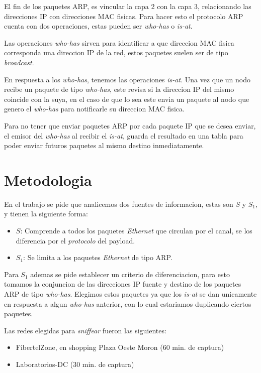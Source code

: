 El fin de los paquetes ARP, es vincular la capa 2 con la capa 3, relacionando las direcciones IP con direcciones MAC fisicas. Para hacer esto el protocolo ARP cuenta con dos operaciones, estas pueden ser \textit{who-has} o \textit{is-at}.

Las operaciones \textit{who-has} sirven para identificar a que direccion MAC fisica corresponda una direccion IP de la red, estos paquetes suelen ser de tipo \textit{broadcast}.

En respuesta a los \textit{who-has}, tenemos las operaciones \textit{is-at}. Una vez que un nodo recibe un paquete de tipo \textit{who-has}, este revisa si la direccion IP del mismo coincide con la suya, en el caso de que lo sea este envia un paquete al nodo que genero el \textit{who-has} para notificarle su direccion MAC fisica.

Para no tener que enviar paquetes ARP por cada paquete IP que se desea enviar, el emisor del \textit{who-has} al recibir el \textit{is-at}, guarda el resultado en una tabla para poder enviar futuros paquetes al mismo destino inmediatamente.

\section{Metodologia}

En el trabajo se pide que analicemos dos fuentes de informacion, estas son $S$ y $S_1$, y tienen la siguiente forma:

\begin{itemize}
	\item $S$: Comprende a todos los paquetes \textit{Ethernet} que circulan por el canal, se los diferencia por el \textit{protocolo} del payload.
	\item $S_1$: Se limita a los paquetes \textit{Ethernet} de tipo ARP.
\end{itemize}

\pagebreak

Para $S_1$ ademas se pide establecer un criterio de diferenciacion, para esto tomamos la conjuncion de las direcciones IP fuente y destino de los paquetes ARP de tipo \textit{who-has}. Elegimos estos paquetes ya que los \textit{is-at} se dan unicamente en respuesta a algun \textit{who-has} anterior, con lo cual estariamos duplicando ciertos paquetes.

Las redes elegidas para \textit{sniffear} fueron las siguientes:

\begin{itemize}
	\item FibertelZone, en shopping Plaza Oeste Moron (60 min. de captura)
	\item Laboratorios-DC (30 min. de captura)
\end{itemize}

